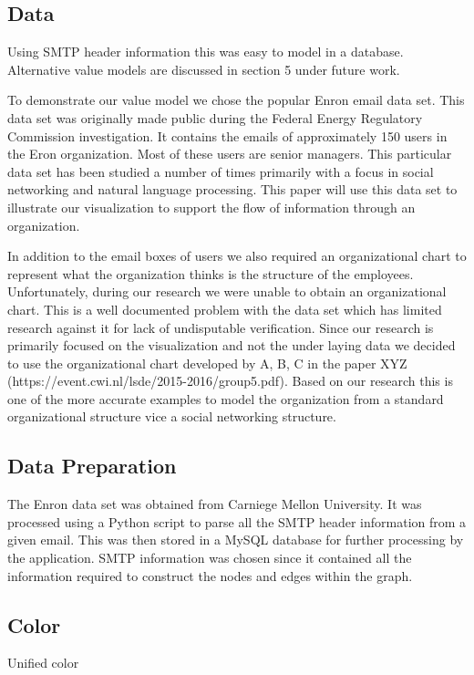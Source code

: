 \documentclass[journal]{vgtc}                %
\begin{document}
\subsection{Data}
Using SMTP header information this was easy to model in a database.  Alternative value models are discussed in section 5 under future work.

To demonstrate our value model we chose the popular Enron email data set.  This data set was originally made public during the Federal Energy Regulatory Commission investigation.  It contains the emails of approximately 150 users in the Eron organization.  Most of these users are senior managers.  This particular data set has been studied a number of times primarily with a focus in social networking and natural language processing.  This paper will use this data set to illustrate our visualization to support the flow of information through an organization.  

In addition to the email boxes of users we also required an organizational chart to represent what the organization thinks is the structure of the employees.  Unfortunately, during our research we were unable to obtain an organizational chart.  This is a well documented problem with the data set which has limited research against it for lack of undisputable verification.  Since our research is primarily focused on the visualization and not the under laying data we decided to use the organizational chart developed by A, B, C in the paper XYZ (https://event.cwi.nl/lsde/2015-2016/group5.pdf).  Based on our research this is one of the more accurate examples to model the organization from a standard organizational structure vice a social networking structure.

\subsection{Data Preparation}

The Enron data set was obtained from Carniege Mellon University.  It was processed using a Python script to parse all the SMTP header information from a given email.  This was then stored in a MySQL database for further processing by the application.  SMTP information was chosen since it contained all the information required to construct the nodes and edges within the graph.  

\subsection{Color}
Unified color
\end{document}
